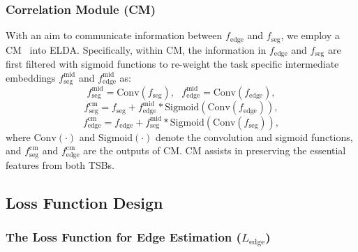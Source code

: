 \documentclass{bmvc2k}
\newcommand{\Sig}{\text{Sigmoid}}
\newcommand{\Conv}{\text{Conv}}
\newcommand{\fy}{f_{\text{seg}}}
\newcommand{\fe}{f_{\text{edge}}}
\newcommand{\fycm}{f_{\text{seg}}^{\text{cm}}}
\newcommand{\fecm}{f_{\text{edge}}^{\text{cm}}}
\newcommand{\fyat}{f_{\text{seg}}^{\text{mid}}}
\newcommand{\feat}{f_{\text{edge}}^{\text{mid}}}
\newcommand{\Ledge}{L_{\text{edge}}}
\begin{document}
\subsubsection{Correlation Module (CM)}
\label{subsubsec::CM}
With an aim to communicate information between 
$\fe$ and $\fy$, we employ a CM~\cite{padnet, wang2021domain} into ELDA. Specifically, 
within CM, the information in $\fe$ and $\fy$ are first filtered with sigmoid functions to re-weight the task specific intermediate embeddings $\fyat$ and $\feat$ as:
\begin{equation}
\fyat = \Conv(\fy),\,\,\,\,
\feat  = \Conv(\fe),
\end{equation}
\begin{equation}
\fycm = \fy + \feat * \Sig(\Conv(\fe)),
\end{equation}
\begin{equation}
\fecm  = \fe + \fyat * \Sig(\Conv(\fy)),
\end{equation}
where $\Conv(\cdot)$ and $\Sig(\cdot)$ denote the convolution and sigmoid functions, and $\fycm$ and $\fecm$ are the outputs of CM.  CM assists in preserving the essential features from both TSBs. 

















\subsection{Loss Function Design}
\label{subsec::loss_function}



\subsubsection{The Loss Function for Edge Estimation ($\Ledge$)}
\end{document}
